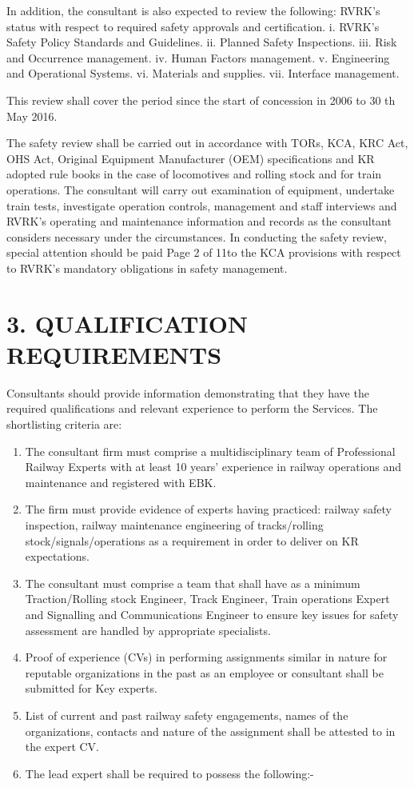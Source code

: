 In addition, the consultant is also expected to review the following:
RVRK's status with respect to required safety approvals and
certification. i. RVRK's Safety Policy Standards and Guidelines. ii.
Planned Safety Inspections. iii. Risk and Occurrence management. iv.
Human Factors management. v. Engineering and Operational Systems. vi.
Materials and supplies. vii. Interface management.

This review shall cover the period since the start of concession in 2006
to 30 th May 2016.

The safety review shall be carried out in accordance with TORs, KCA, KRC
Act, OHS Act, Original Equipment Manufacturer (OEM) specifications and
KR adopted rule books in the case of locomotives and rolling stock and
for train operations. The consultant will carry out examination of
equipment, undertake train tests, investigate operation controls,
management and staff interviews and RVRK's operating and maintenance
information and records as the consultant considers necessary under the
circumstances. In conducting the safety review, special attention should
be paid Page 2 of 11to the KCA provisions with respect to RVRK's
mandatory obligations in safety management.

\section{3. QUALIFICATION
	REQUIREMENTS}\label{qualification-requirements}

Consultants should provide information demonstrating that they have the
required qualifications and relevant experience to perform the Services.
The shortlisting criteria are:

\begin{enumerate}

	\item 	The consultant firm must comprise a multidisciplinary team of
	Professional Railway Experts with at least 10 years' experience in
	railway operations and maintenance and registered with EBK.
	\item 	The firm must provide evidence of experts having practiced: railway
	safety inspection, railway maintenance engineering of tracks/rolling
	stock/signals/operations as a requirement in order to deliver on KR
	expectations.
	\item 	The consultant must comprise a team that shall have as a minimum
	Traction/Rolling stock Engineer, Track Engineer, Train operations
	Expert and Signalling and Communications Engineer to ensure key issues
	for safety assessment are handled by appropriate specialists.
	\item 	Proof of experience (CVs) in performing assignments similar in nature
	for reputable organizations in the past as an employee or consultant
	shall be submitted for Key experts.
	\item 	List of current and past railway safety engagements, names of the
	organizations, contacts and nature of the assignment shall be attested
	to in the expert CV.
	\item 	The lead expert shall be required to possess the following:-
\end{enumerate}

